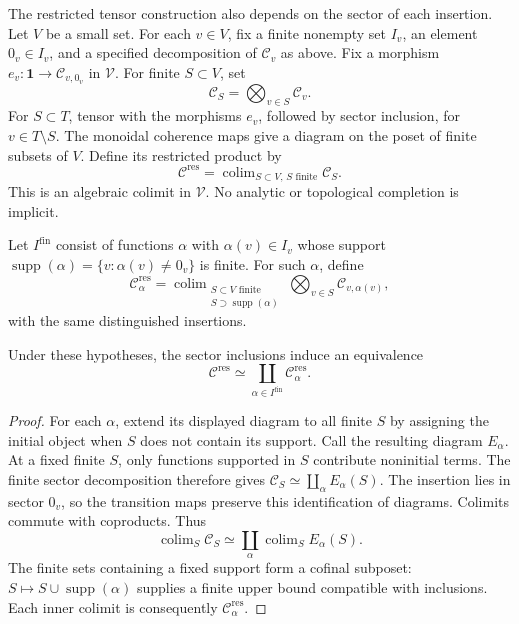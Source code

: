 The restricted tensor construction also depends on the sector of each
insertion. Let $V$ be a small set. For each $v\in V$, fix a finite nonempty set
$I_v$, an element $0_v\in I_v$, and a specified decomposition of
$\mathcal C_v$ as above. Fix a morphism
$e_v:\mathbf1\to\mathcal C_{v,0_v}$ in $\mathcal V$.
For finite $S\subset V$, set
\[
 \mathcal C_S=\bigotimes_{v\in S}\mathcal C_v.
\]
For $S\subset T$, tensor with the morphisms $e_v$, followed by sector
inclusion, for $v\in T\setminus S$. The monoidal coherence maps give a
diagram on the poset of finite subsets of $V$. Define its restricted
product by
\[
 \mathcal C^{\mathrm{res}}=\mathop{\operatorname{colim}}_{S\subset V,
                   \,S\text{ finite}}\mathcal C_S.
\]
This is an algebraic colimit in $\mathcal V$. No analytic or topological
completion is implicit.

Let $I^{\mathrm{fin}}$ consist of functions $\alpha$ with
$\alpha(v)\in I_v$ whose support
$\operatorname{supp}(\alpha)=\{v:\alpha(v)\ne0_v\}$ is finite.
For such $\alpha$, define
\[
 \mathcal C^{\mathrm{res}}_\alpha
 =\mathop{\operatorname{colim}}_{\substack{S\subset V\text{ finite}\\
                       S\supset\operatorname{supp}(\alpha)}}
       \bigotimes_{v\in S}\mathcal C_{v,\alpha(v)},
\]
with the same distinguished insertions.

\begin{proposition}
\label{v4-arith:eis:restricted-sectors}
Under these hypotheses, the sector inclusions induce an equivalence
\[
 \mathcal C^{\mathrm{res}}
 \simeq\coprod_{\alpha\in I^{\mathrm{fin}}}
                   \mathcal C^{\mathrm{res}}_\alpha.
\]
\end{proposition}

\begin{proof}
For each $\alpha$, extend its displayed diagram to all finite $S$ by
assigning the initial object when $S$ does not contain its support.
Call the resulting diagram $E_\alpha$. At a fixed finite $S$, only
functions supported in $S$ contribute noninitial terms. The finite sector
decomposition therefore gives
$\mathcal C_S\simeq\coprod_\alpha E_\alpha(S)$.
The insertion lies in sector $0_v$, so the transition maps preserve this
identification of diagrams. Colimits commute with coproducts. Thus
\[
 \operatorname{colim}_S\mathcal C_S
 \simeq\coprod_\alpha\operatorname{colim}_S E_\alpha(S).
\]
The finite sets containing a fixed support form a cofinal subposet:
$S\mapsto S\cup\operatorname{supp}(\alpha)$ supplies a finite upper
bound compatible with inclusions. Each inner colimit is consequently
$\mathcal C^{\mathrm{res}}_\alpha$.
\end{proof}

